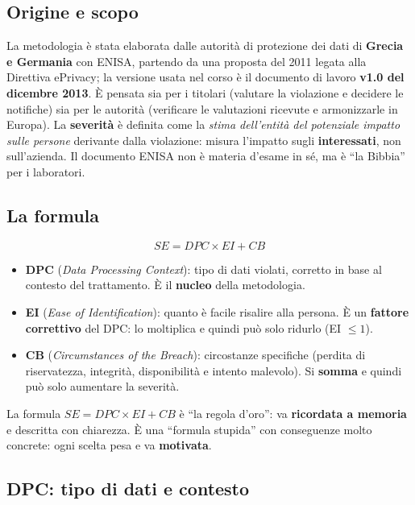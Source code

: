 \subsection{Origine e scopo}
La metodologia è stata elaborata dalle autorità di protezione dei dati di \textbf{Grecia e Germania}
con ENISA, partendo da una proposta del 2011 legata alla Direttiva ePrivacy; la versione usata nel corso
è il documento di lavoro \textbf{v1.0 del dicembre 2013}. È pensata sia per i titolari (valutare la
violazione e decidere le notifiche) sia per le autorità (verificare le valutazioni ricevute e
armonizzarle in Europa). La \textbf{severità} è definita come la \emph{stima dell'entità del potenziale
impatto sulle persone} derivante dalla violazione: misura l'impatto sugli \textbf{interessati}, non
sull'azienda. Il documento ENISA non è materia d'esame in sé, ma è ``la Bibbia'' per i laboratori.

\subsection{La formula}
\[
SE = DPC \times EI + CB
\]
\begin{itemize}
  \item \textbf{DPC} (\emph{Data Processing Context}): tipo di dati violati, corretto in base al contesto
    del trattamento. È il \textbf{nucleo} della metodologia.
  \item \textbf{EI} (\emph{Ease of Identification}): quanto è facile risalire alla persona. È un
    \textbf{fattore correttivo} del DPC: lo moltiplica e quindi può solo ridurlo (EI $\le 1$).
  \item \textbf{CB} (\emph{Circumstances of the Breach}): circostanze specifiche (perdita di
    riservatezza, integrità, disponibilità e intento malevolo). Si \textbf{somma} e quindi può solo
    aumentare la severità.
\end{itemize}

\begin{esame}
La formula $SE = DPC \times EI + CB$ è ``la regola d'oro'': va \textbf{ricordata a memoria} e descritta
con chiarezza. È una ``formula stupida'' con conseguenze molto concrete: ogni scelta pesa e va
\textbf{motivata}.
\end{esame}

\subsection{DPC: tipo di dati e contesto}
\label{sec:breach-dpc}

